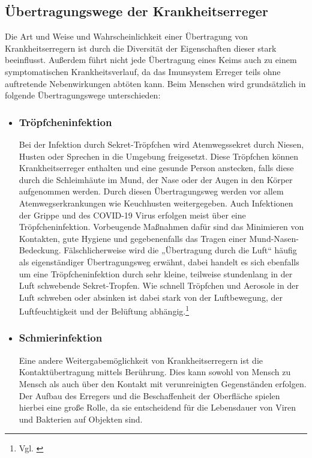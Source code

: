 \documentclass[12pt]{article}
\begin{document}
\subsection{Übertragungswege der Krankheitserreger}
Die Art und Weise und Wahrscheinlichkeit einer Übertragung von Krankheitserregern ist durch die Diversität der Eigenschaften dieser stark beeinflusst. Außerdem führt nicht jede Übertragung eines Keims auch zu einem symptomatischen Krankheitsverlauf, da das Imunsystem Erreger teils ohne auftretende Nebenwirkungen abtöten kann. Beim Menschen wird grundsätzlich in folgende Übertragungswege unterschieden:
\begin{itemize}
    \item \subsubsection{Tröpfcheninfektion}\label{sec:Troepfchen}
    Bei der Infektion durch Sekret-Tröpfchen wird Atemwegssekret durch Niesen, Husten oder Sprechen in die Umgebung freigesetzt. Diese Tröpfchen können Krankheitserreger enthalten und eine gesunde Person anstecken, falls diese durch die Schleimhäute im  Mund, der Nase oder der Augen in den Körper aufgenommen werden. Durch diesen Übertragungsweg werden vor allem Atemwegserkrankungen wie Keuchhusten weitergegeben. Auch Infektionen der Grippe und des COVID-19 Virus erfolgen meist über eine Tröpfcheninfektion. Vorbeugende Maßnahmen dafür sind das Minimieren von Kontakten, gute Hygiene und gegebenenfalls das Tragen einer Mund-Nasen-Bedeckung.
    Fälschlicherweise wird die „Übertragung durch die Luft“ häufig als eigenständiger Übertragungsweg erwähnt, dabei handelt es sich ebenfalls um eine Tröpfcheninfektion durch sehr kleine, teilweise stundenlang in der Luft schwebende Sekret-Tropfen. Wie schnell Tröpfchen und Aerosole in der Luft schweben oder absinken ist dabei stark von der Luftbewegung, der Luftfeuchtigkeit und der Belüftung abhängig.\footnote{Vgl. \cite{Rki21}}
    \item \subsubsection{Schmierinfektion}
    Eine andere Weitergabemöglichkeit von Krankheitserregern ist die Kontaktübertragung mittels Berührung. Dies kann sowohl von Mensch zu Mensch als auch über den Kontakt mit verunreinigten Gegenständen erfolgen. Der Aufbau des Erregers und die Beschaffenheit der Oberfläche spielen hierbei eine große Rolle, da sie entscheidend für die Lebensdauer von Viren und Bakterien auf Objekten sind.

\end{itemize}
\end{document}
